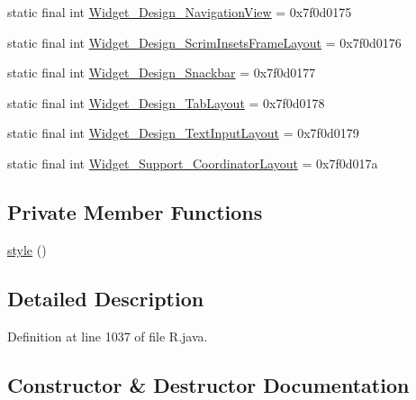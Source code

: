 \begin{DoxyCompactItemize}
\item 
static final int \mbox{\hyperlink{classandroid_1_1support_1_1design_1_1_r_1_1style_ab1b972b922c73220c4cbf8cd7c235fe7}{Widget\+\_\+\+Design\+\_\+\+Navigation\+View}} = 0x7f0d0175
\item 
static final int \mbox{\hyperlink{classandroid_1_1support_1_1design_1_1_r_1_1style_a87e6d222c0aa6cdb22bd196a42738102}{Widget\+\_\+\+Design\+\_\+\+Scrim\+Insets\+Frame\+Layout}} = 0x7f0d0176
\item 
static final int \mbox{\hyperlink{classandroid_1_1support_1_1design_1_1_r_1_1style_a39ee29a1451944b167ccbe405224a219}{Widget\+\_\+\+Design\+\_\+\+Snackbar}} = 0x7f0d0177
\item 
static final int \mbox{\hyperlink{classandroid_1_1support_1_1design_1_1_r_1_1style_a4e18e9a3dd0772b01328ac0bb36863e7}{Widget\+\_\+\+Design\+\_\+\+Tab\+Layout}} = 0x7f0d0178
\item 
static final int \mbox{\hyperlink{classandroid_1_1support_1_1design_1_1_r_1_1style_aa16e720283622554378e2d9ea5437fdf}{Widget\+\_\+\+Design\+\_\+\+Text\+Input\+Layout}} = 0x7f0d0179
\item 
static final int \mbox{\hyperlink{classandroid_1_1support_1_1design_1_1_r_1_1style_a23cf73966d8f8c806022639b928ea871}{Widget\+\_\+\+Support\+\_\+\+Coordinator\+Layout}} = 0x7f0d017a
\end{DoxyCompactItemize}
\subsection*{Private Member Functions}
\begin{DoxyCompactItemize}
\item 
\mbox{\hyperlink{classandroid_1_1support_1_1design_1_1_r_1_1style_ab248b295e7fe15631ede5d602dc16a46}{style}} ()
\end{DoxyCompactItemize}


\subsection{Detailed Description}


Definition at line 1037 of file R.\+java.



\subsection{Constructor \& Destructor Documentation}
\mbox{\label{classandroid_1_1support_1_1design_1_1_r_1_1style_ab248b295e7fe15631ede5d602dc16a46}} 
